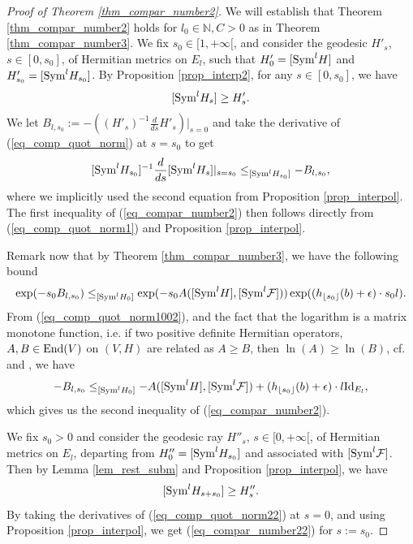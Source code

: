 \documentclass[12pt]{article}
\numberwithin{equation}{section}
\theoremstyle{theorem}
\theoremstyle{definition}
\theoremstyle{remark}
\newcommand{\nat}{\mathbb{N}}
\begin{document}
	\begin{proof}[Proof of Theorem \ref{thm_compar_number2}]
		We will establish that Theorem \ref{thm_compar_number2} holds for $l_0 \in \nat, C > 0$ as in Theorem \ref{thm_compar_number3}.
		We fix $s_0 \in [1, +\infty[$, and consider the geodesic $H'_s$, $s \in [0, s_0]$, of Hermitian metrics on $E_l$, such that $H'_0 = [{\rm{Sym}}^l H]$ and $H'_{s_0} = [{\rm{Sym}}^l H_{s_0}]$.
		By Proposition \ref{prop_interp2}, for any $s \in [0, s_0]$, we have 
		\begin{equation}\label{eq_comp_quot_norm}
			[{\rm{Sym}}^l H_s] \geq H'_s.
		\end{equation}
		We let $B_{l, s_0} := - ((H'_s)^{-1} \frac{d}{ds} H'_s)|_{s = 0}$ and take the derivative of (\ref{eq_comp_quot_norm}) at $s = s_0$ to get
		\begin{equation}\label{eq_comp_quot_norm1}
			[{\rm{Sym}}^l H_{s_0}]^{-1} \frac{d}{ds} [{\rm{Sym}}^l H_s]|_{s = s_0}
			\leq_{[{\rm{Sym}}^l H_{s_0}]}
			- B_{l, s_0},
		\end{equation}
		where we implicitly used the second equation from Proposition \ref{prop_interpol}.
		The first inequality of (\ref{eq_compar_number2}) then follows directly from (\ref{eq_comp_quot_norm1}) and Proposition \ref{prop_interpol}.
		\par 
		Remark now that by Theorem \ref{thm_compar_number3}, we have the following bound
		\begin{equation}\label{eq_comp_quot_norm1002}
			\exp(- s_0 B_{l, s_0})
			\leq_{[{\rm{Sym}}^l H_0]}
			\exp(
			-s_0
			A([{\rm{Sym}}^l H], [{\rm{Sym}}^l \mathcal{F}]) )
			\exp( ( h_{\lfloor s_0 \rfloor}(b) + \epsilon ) \cdot s_0 l ).
		\end{equation}
		From (\ref{eq_comp_quot_norm1002}), and the fact that the logarithm is a matrix monotone function, i.e. if two positive definite Hermitian operators, $A, B \in {\rm{End}}(V)$ on $(V, H)$ are related as $A \geq B$, then $\ln(A) \geq \ln(B)$, cf. \cite{LoewnerArt} and \cite{SimonBarryLoewn}, we have
		\begin{equation}\label{eq_comp_quot_norm2}
			- B_{l, s_0}
			\leq_{[{\rm{Sym}}^l H_0]}
			-
			A([{\rm{Sym}}^l H], [{\rm{Sym}}^l \mathcal{F}])
			+ ( h_{\lfloor s_0 \rfloor}(b) + \epsilon ) \cdot l {\rm{Id}}_{E_l},
		\end{equation}
		which gives us the second inequality of (\ref{eq_compar_number2}).
		\par 
		We fix $s_0 > 0$ and consider the geodesic ray $H''_s$, $s \in [0, +\infty[$, of Hermitian metrics on $E_l$, departing from $H''_0 = [{\rm{Sym}}^l H_{s_0}]$ and associated with $[{\rm{Sym}}^l \mathcal{F}]$.
		Then by Lemma \ref{lem_rest_subm} and Proposition \ref{prop_interpol}, we have
		\begin{equation}\label{eq_comp_quot_norm22}
			[{\rm{Sym}}^l H_{s + s_0}] \geq H''_s.
		\end{equation}
		By taking the derivatives of (\ref{eq_comp_quot_norm22}) at $s = 0$, and using Proposition \ref{prop_interpol}, we get (\ref{eq_compar_number22}) for $s := s_0$.
	\end{proof}
\end{document}

